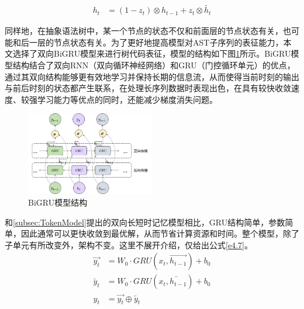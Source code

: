 \begin{equation}\label{e4.6}
  \begin{split}
   h_t &= \left(1- z_t\right) \otimes h_{t-1} +  z_t \otimes \widetilde{h_t}
  \end{split}
\end{equation}

同样地，在抽象语法树中，某一个节点的状态不仅和前面层的节点状态有关，也可能和后一层的节点状态有关。为了更好地提高模型对AST子序列的表征能力，本文选择了双向BiGRU模型来进行树代码表征，模型的结构如下图\ref{fig:BiGRU}所示。BiGRU模型结构结合了双向RNN（双向循环神经网络）和GRU（门控循环单元）的优点，通过其双向结构能够更有效地学习并保持长期的信息流，从而使得当前时刻的输出与前后时刻的状态都产生联系，在处理长序列数据时表现出色，在具有较快收敛速度、较强学习能力等优点的同时，还能减少梯度消失问题。

\begin{figure}[H]
  \centering
  \includegraphics[width=0.5\textwidth]{figures/BiGRU.png}
  \caption{BiGRU模型结构}\label{fig:BiGRU}
\end{figure}

和\ref{subsec:TokenModel}提出的双向长短时记忆模型相比，GRU结构简单，参数简单，因此通常可以更快收敛到最优解，从而节省计算资源和时间。整个模型，除了子单元有所改变外，架构不变。这里不展开介绍，仅给出公式\ref{e4.7}。
\begin{equation}\label{e4.7}
  \begin{split}
    \overrightarrow{y_t} &= W_0 \cdot GRU\left(x_{t},\overrightarrow{h_{t-1}}\right) + b_0
    \\
    \overleftarrow{y_t} &= W_0 \cdot GRU\left(x_{t},\overleftarrow{h_{t-1}}\right) + b_0
    \\
    y_t &= \overrightarrow{y_t} \oplus\overleftarrow{y_t}
  \end{split}
\end{equation}


